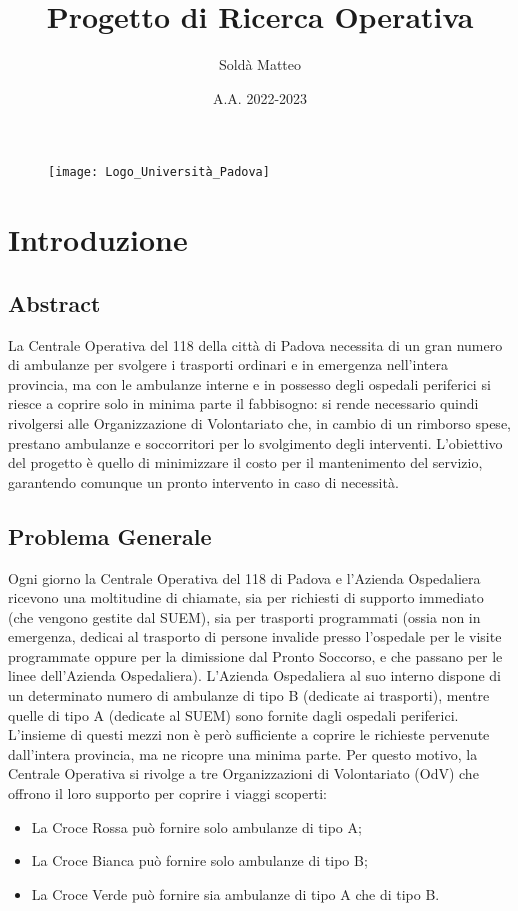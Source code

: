 \documentclass[10pt, a4paper]{article}
\title{Progetto di Ricerca Operativa}
\author{Soldà Matteo }
\date{A.A. 2022-2023}
\begin{document}
\begin{figure}
    \centering
    \texttt{[image: Logo\_Università\_Padova]}
\end{figure}

\maketitle

\newpage
\tableofcontents

\newpage
\section{Introduzione}
\subsection{Abstract}
La Centrale Operativa del 118 della città di Padova necessita di un gran numero di ambulanze per svolgere i trasporti ordinari e in emergenza nell’intera provincia, ma con le ambulanze interne e in possesso degli ospedali periferici si riesce a coprire solo in minima parte il fabbisogno: si rende necessario quindi rivolgersi alle Organizzazione di Volontariato che, in cambio di un rimborso spese, prestano ambulanze e soccorritori per lo svolgimento degli interventi. 
L’obiettivo del progetto è quello di minimizzare il costo per il mantenimento del servizio, garantendo comunque un pronto intervento in caso di necessità. 

\subsection{Problema Generale}
Ogni giorno la Centrale Operativa del 118 di Padova e l'Azienda Ospedaliera ricevono una moltitudine di chiamate, sia per richiesti di supporto immediato (che vengono gestite dal SUEM), sia per trasporti programmati (ossia non in emergenza, dedicai al trasporto di persone invalide presso l'ospedale per le visite programmate oppure per la dimissione dal Pronto Soccorso, e che passano per le linee dell'Azienda Ospedaliera).
\newline \newline
L'Azienda Ospedaliera al suo interno dispone di un determinato numero di ambulanze di tipo B (dedicate ai trasporti), mentre quelle di tipo A (dedicate al SUEM) sono fornite dagli ospedali periferici. L'insieme di questi mezzi non è però sufficiente a coprire le richieste pervenute dall'intera provincia, ma ne ricopre una minima parte. Per questo motivo, la Centrale Operativa si rivolge a tre Organizzazioni di Volontariato (OdV) che offrono il loro supporto per coprire i viaggi scoperti:
\begin{itemize}
    \item La Croce Rossa può fornire solo ambulanze di tipo A;
    \item La Croce Bianca può fornire solo ambulanze di tipo B;
    \item La Croce Verde può fornire sia ambulanze di tipo A che di tipo B.
\end{itemize}
\end{document}
